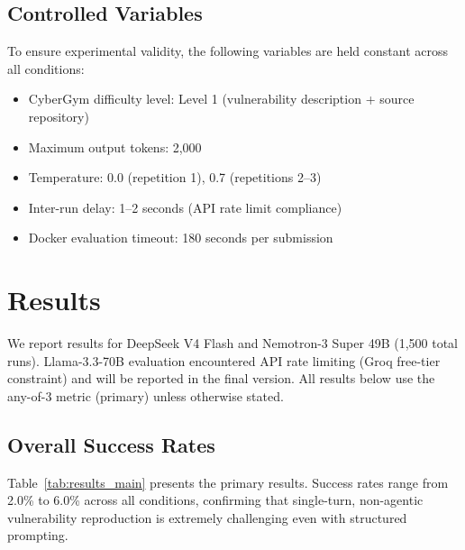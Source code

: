 \documentclass{ieeeaccess}
\begin{document}
\subsection{Controlled Variables}

To ensure experimental validity, the following variables are held constant across all conditions:

\begin{itemize}
    \item CyberGym difficulty level: Level 1 (vulnerability description + source repository)
    \item Maximum output tokens: 2,000
    \item Temperature: 0.0 (repetition 1), 0.7 (repetitions 2--3)
    \item Inter-run delay: 1--2 seconds (API rate limit compliance)
    \item Docker evaluation timeout: 180 seconds per submission
\end{itemize}

\section{Results}
\label{sec:results}

We report results for DeepSeek V4 Flash and Nemotron-3 Super 49B (1,500 total runs). Llama-3.3-70B evaluation encountered API rate limiting (Groq free-tier constraint) and will be reported in the final version. All results below use the any-of-3 metric (primary) unless otherwise stated.

\subsection{Overall Success Rates}

Table~\ref{tab:results_main} presents the primary results. Success rates range from 2.0\% to 6.0\% across all conditions, confirming that single-turn, non-agentic vulnerability reproduction is extremely challenging even with structured prompting.
\end{document}
